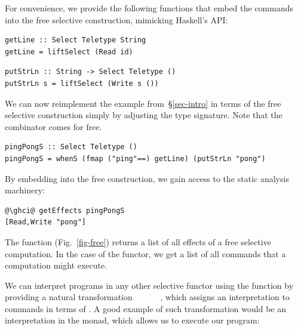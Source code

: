 \noindent
For convenience, we provide the following functions that embed the commands into
the free selective construction, mimicking Haskell's  API:

\vspace{1mm}
\begin{verbatim}
getLine :: Select Teletype String
getLine = liftSelect (Read id)
\end{verbatim}
\vspace{1mm}
\begin{verbatim}
putStrLn :: String -> Select Teletype ()
putStrLn s = liftSelect (Write s ())
\end{verbatim}
\vspace{1mm}

\noindent
We can now reimplement the  example from~\S\ref{sec-intro} in
terms of the free selective construction simply by adjusting the type signature.
Note that the  combinator comes for free.

\vspace{1mm}
\begin{verbatim}
pingPongS :: Select Teletype ()
pingPongS = whenS (fmap ("ping"==) getLine) (putStrLn "pong")
\end{verbatim}
\vspace{1mm}

\noindent
By embedding  into the free construction, we gain access to the
static analysis machinery:

\vspace{1mm}
\begin{verbatim}
@\ghci@ getEffects pingPongS
[Read,Write "pong"]
\end{verbatim}
\vspace{1mm}

\noindent
The  function (Fig.~\ref{fig-free}) returns a list of all effects
of a free selective computation. In the case of the  functor, we
get a list of all commands that a computation might execute.


We can interpret  programs in any other selective functor using
the  function by providing a natural transformation
~~~~\hs{->}~~, which assigns an
interpretation to  commands in terms of . A good example of
such transformation would be an interpretation in the  monad, which
allows us to execute our  program:

